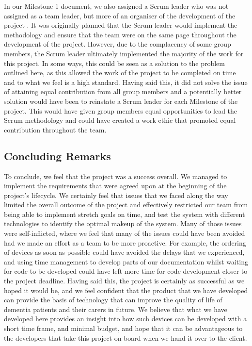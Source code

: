                 In our Milestone 1 document, we also assigned a Scrum leader who was not assigned as a team leader, but more of an organiser of the development of the project \cite{coaker}. It was originally planned that the Scrum leader would implement the methodology and ensure that the team were on the same page throughout the development of the project. However, due to the complacency of some group members, the Scrum leader ultimately implemented the majority of the work for this project. In some ways, this could be seen as a solution to the problem outlined here, as this allowed the work of the project to be completed on time and to what we feel is a high standard. Having said this, it did not solve the issue of attaining equal contribution from all group members and a potentially better solution would have been to reinstate a Scrum leader for each Milestone of the project. This would have given group members equal opportunities to lead the Scrum methodology and could have created a work ethic that promoted equal contribution throughout the team.

        \subsection{Concluding Remarks}

            To conclude, we feel that the project was a success overall. We managed to implement the requirements that were agreed upon at the beginning of the project's lifecycle. We certainly feel that issues that we faced along the way limited the overall outcome of the project and effectively restricted our team from being able to implement stretch goals on time, and test the system with different technologies to identify the optimal makeup of the system. Many of those issues were self-inflicted, where we feel that many of the issues could have been avoided had we made an effort as a team to be more proactive. For example, the ordering of devices as soon as possible could have avoided the delays that we experienced, and using time management to develop parts of our documentation whilst waiting for code to be developed could have left more time for code development closer to the project deadline. Having said this, the project is certainly as successful as we hoped it would be, and we feel confident that the product that we have developed can provide the basis of technology that can improve the quality of life of dementia patients and their carers in future. We believe that what we have developed here provides an insight into how such devices can be developed with a short time frame, and minimal budget, and hope that it can be advantageous to the developers that take this project on board when we hand it over to the client.

